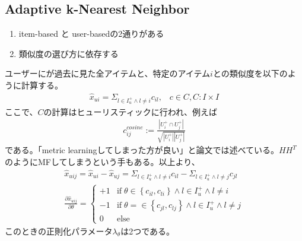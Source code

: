 \documentclass[onecolumn,10pt]{article}
\begin{document}
\subsection{Adaptive k-Nearest Neighbor}
\begin{enumerate}
	\item item-based と user-basedの2通りがある
	\item 類似度の選び方に依存する
\end{enumerate}

ユーザーにが過去に見た全アイテムと、特定のアイテム$i$との類似度を以下のように計算する。
\begin{align}
	\hat x_{ui} = \Sigma_{l \in I_{u}^{+} \land l \neq i} c_{il}, \;\;\; c \in C,  C: I \times I 
\end{align}
ここで、$C$の計算はヒューリスティックに行われ、例えば
\begin{align}
	c_{ij}^{cosine} := \frac{|U_{i}^{+} \cap U_{j}^{+} |}{\sqrt{|U_{i}^{+}||U_{j}^{+}|}}
\end{align}
である。「metric learningしてしまった方が良い」と論文では述べている。$HH^T$のようにMFしてしまうという手もある。以上より、
\begin{align}
	\hat x_{uij} = \hat x_{ui} - \hat x_{uj} = \Sigma_{l \in I_{u}^{+} \land l \neq i}  c_{il} - \Sigma_{l \in I_{u}^{+} \land l \neq j}  c_{jl} \\
	\frac{\partial \hat x_{uij}}{\partial \theta} = \left\{
		\begin{array}{ll}
			+1 & \mathrm{if}\;\theta \in \left\{c_{il}, c_{li} \right\} \land l \in I_{u}^{+} \land l \neq i  \\
			-1 & \mathrm{if}\;\theta = \in \left\{c_{jl}, c_{lj} \right\} \land l \in I_{u}^{+} \land l \neq j \\
			0 & \mathrm{else}
		\end{array}
	\right.
\end{align}
このときの正則化パラメータ$\lambda_\theta$は2つである。
\end{document}
